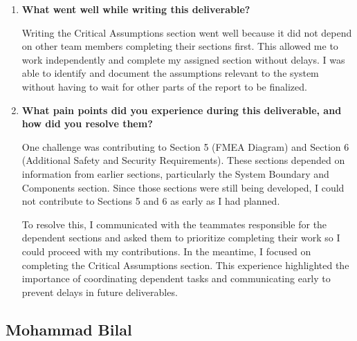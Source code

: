 \documentclass{article}
\begin{document}
\begin{enumerate}
    \item \textbf{What went well while writing this deliverable?}
    
    Writing the Critical Assumptions section went well because
    it did not depend on other team members completing their
    sections first. This allowed me to work independently
    and complete my assigned section without delays.
    I was able to identify and document the assumptions
    relevant to the system without having to wait for
    other parts of the report to be finalized.

    \item \textbf{What pain points did you experience during this deliverable,
    and how did you resolve them?}

    One challenge was contributing to Section 5 (FMEA Diagram)
    and Section 6 (Additional Safety and Security Requirements).
    These sections depended on information from earlier sections,
    particularly the System Boundary and Components section.
    Since those sections were still being developed, I could
    not contribute to Sections 5 and 6 as early as I had planned.

    To resolve this, I communicated with the teammates
    responsible for the dependent sections and asked them
    to prioritize completing their work so I could proceed
    with my contributions. In the meantime, I focused on
    completing the Critical Assumptions section. This
    experience highlighted the importance of coordinating
    dependent tasks and communicating early to prevent
    delays in future deliverables.
\end{enumerate}

\subsection*{Mohammad Bilal}
\end{document}
